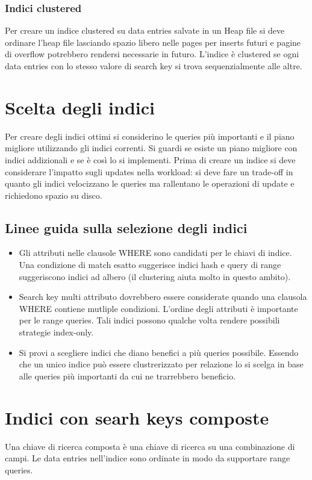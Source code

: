 \subsubsection{Indici clustered}
Per creare un indice clustered su data entries salvate in un Heap file si deve ordinare l'heap file lasciando spazio libero nelle pages per inserts futuri e pagine di overflow potrebbero rendersi necessarie in futuro.
L'indice \`e clustered se ogni data entries con lo stesso valore di search key si trova sequenzialmente alle altre. 
\section{Scelta degli indici}
Per creare degli indici ottimi si considerino le queries pi\`u importanti e il piano migliore utilizzando gli indici correnti. Si guardi se esiste un piano migliore con indici addizionali e se \`e cos\`i lo si implementi. Prima di
creare un indice si deve considerare l'impatto sugli updates nella workload: si deve fare un trade-off in quanto gli indici velocizzano le queries ma rallentano le operazioni di update e richiedono spazio su disco.
\subsection{Linee guida sulla selezione degli indici}
\begin{itemize}
\item Gli attributi nelle clausole WHERE sono candidati per le chiavi di indice. Una condizione di match esatto suggerisce indici hash e query di range suggeriscono indici ad albero (il clustering aiuta molto in 
questo ambito). 
\item Search key multi attributo dovrebbero essere considerate quando una clausola WHERE contiene mutliple condizioni. L'ordine degli attributi \`e importante per le range queries. Tali indici possono 
qualche volta rendere possibili strategie index-only.
\item Si provi a scegliere indici che diano benefici a pi\`u queries possibile. Essendo che un unico indice pu\`o essere clustrerizzato per relazione lo si scelga in base alle queries pi\`u importanti da cui ne 
trarrebbero beneficio.
\end{itemize}
\section{Indici con searh keys composte}
Una chiave di ricerca composta \`e una chiave di ricerca su una combinazione di campi. Le data entries nell'indice sono ordinate in modo da supportare range queries. 
